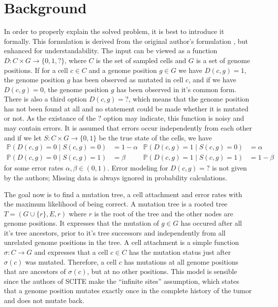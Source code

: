\section{Background}

In order to properly explain the solved problem, it is best to introduce it formally. This formulation is derived from the original author's formulation \cite{tree2016}, but enhanced for understandability. The input can be viewed as a function $D: C \times G \rightarrow \{0, 1, ?\}$, where $C$ is the set of sampled cells and $G$ is a set of genome positions. If for a cell $c \in C$ and a genome position $g \in G$ we have $D(c, g) = 1$, the genome position $g$ has been observed as mutated in cell $c$, and if we have $D(c, g) = 0$, the genome position $g$ has been observed in it's common form. There is also a third option $D(c, g) = ?$, which means that the genome position has not been found at all and no statement could be made whether it is mutated or not. As the existance of the $?$ option may indicate, this function is noisy and may contain errors. It is assumed that errors occur independently from each other and if we let $S: C \times G \rightarrow \{0, 1\}$ be the true state of the cells, we have
\begin{align*}
    \mathbb{P}(D(c, g) = 0 \mid S(c, g) = 0) &= 1 - \alpha & \mathbb{P}(D(c, g) = 1 \mid S(c, g) = 0) &= \alpha \\
    \mathbb{P}(D(c, g) = 0 \mid S(c, g) = 1) &= \beta & \mathbb{P}(D(c, g) = 1 \mid S(c, g) = 1) &= 1 - \beta
\end{align*}
for some error rates $\alpha, \beta \in (0, 1)$. Error modeling for $D(c, g) = ?$ is not given by the authors; Missing data is always ignored in probability calculations.

The goal now is to find a mutation tree, a cell attachment and error rates with the maximum likelihood of being correct. A mutation tree is a rooted tree $T = (G \cup \{r\}, E, r)$ where $r$ is the root of the tree and the other nodes are genome positions. It expresses that the mutation of $g \in G$ has occured after all it's tree ancestors, prior to it's tree successors and independently from all unrelated genome positions in the tree. A cell attachment is a simple function $\sigma: C \rightarrow G$ and expresses that a cell $c \in C$ has the mutation status just after $\sigma(c)$ was mutated. Therefore, a cell $c$ has mutations at all genome positions that are ancestors of $\sigma(c)$, but at no other positions. This model is sensible since the authors of \ac{SCITE} make the ``infinite sites'' assumption, which states that a genome position mutates exactly once in the complete history of the tumor and does not mutate back.

